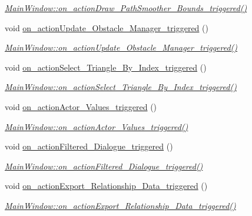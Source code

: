 \begin{DoxyCompactItemize}
\begin{DoxyCompactList}\small\item\em \hyperlink{class_main_window_a7330dbe2178ee265a4b88c11d7c6f566}{Main\+Window\+::on\+\_\+action\+Draw\+\_\+\+Path\+Smoother\+\_\+\+Bounds\+\_\+triggered()} \end{DoxyCompactList}\item 
void \hyperlink{class_main_window_aa55570f1424f04c029ac0ccdb5c49674}{on\+\_\+action\+Update\+\_\+\+Obstacle\+\_\+\+Manager\+\_\+triggered} ()
\begin{DoxyCompactList}\small\item\em \hyperlink{class_main_window_aa55570f1424f04c029ac0ccdb5c49674}{Main\+Window\+::on\+\_\+action\+Update\+\_\+\+Obstacle\+\_\+\+Manager\+\_\+triggered()} \end{DoxyCompactList}\item 
void \hyperlink{class_main_window_ad60b7b6646fc2e3859d0d96337f4fe53}{on\+\_\+action\+Select\+\_\+\+Triangle\+\_\+\+By\+\_\+\+Index\+\_\+triggered} ()
\begin{DoxyCompactList}\small\item\em \hyperlink{class_main_window_ad60b7b6646fc2e3859d0d96337f4fe53}{Main\+Window\+::on\+\_\+action\+Select\+\_\+\+Triangle\+\_\+\+By\+\_\+\+Index\+\_\+triggered()} \end{DoxyCompactList}\item 
void \hyperlink{class_main_window_a5aa38fdd3e3ea03f2fc2858d9110f2c6}{on\+\_\+action\+Actor\+\_\+\+Values\+\_\+triggered} ()
\begin{DoxyCompactList}\small\item\em \hyperlink{class_main_window_a5aa38fdd3e3ea03f2fc2858d9110f2c6}{Main\+Window\+::on\+\_\+action\+Actor\+\_\+\+Values\+\_\+triggered()} \end{DoxyCompactList}\item 
void \hyperlink{class_main_window_a854ffd157a8571cc473a10628cf1967a}{on\+\_\+action\+Filtered\+\_\+\+Dialogue\+\_\+triggered} ()
\begin{DoxyCompactList}\small\item\em \hyperlink{class_main_window_a854ffd157a8571cc473a10628cf1967a}{Main\+Window\+::on\+\_\+action\+Filtered\+\_\+\+Dialogue\+\_\+triggered()} \end{DoxyCompactList}\item 
void \hyperlink{class_main_window_a3f75e84ed258d8b94b97c8043070f901}{on\+\_\+action\+Export\+\_\+\+Relationship\+\_\+\+Data\+\_\+triggered} ()
\begin{DoxyCompactList}\small\item\em \hyperlink{class_main_window_a3f75e84ed258d8b94b97c8043070f901}{Main\+Window\+::on\+\_\+action\+Export\+\_\+\+Relationship\+\_\+\+Data\+\_\+triggered()} \end{DoxyCompactList}\item 

\end{DoxyCompactItemize}
